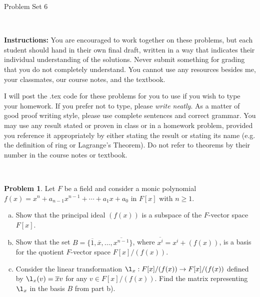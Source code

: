 \documentclass[11pt]{article}
\title{}
\date{\vspace{-0.5in}}
\newcommand{\ov}[1]{\overline{#1}}
\theoremstyle{definition}
\newtheorem{problem}{Problem}
\begin{document}
\thispagestyle{fancy}
\pagestyle{fancy}

\vspace{3em}

\begin{center}
	{\LARGE Problem Set 6}
\end{center}

\

\noindent
{\bf Instructions:}
You are encouraged to work together on these problems, but each student should hand in their own final draft, written in a way that indicates their individual understanding of the solutions. Never submit something for grading that you do not completely understand. You cannot use any resources besides me, your classmates, our course notes, and the textbook.


I will post the .tex code for these problems for you to use if you wish to type your homework. If you prefer not to type, please  {\em write neatly}. As a matter of good proof writing style, please use complete sentences and correct grammar. You may use any result  stated or proven in class or in a homework problem, provided you reference it appropriately by either stating the result or stating its name (e.g. the definition of ring or Lagrange's Theorem). Do not refer to theorems by their number in the course notes or textbook.


\





\begin{problem}
Let $F$ be a field and consider a monic polynomial $f(x)=x^n+a_{n-1}x^{n-1}+\cdots+a_1x+a_0$ in $F[x]$ with $n \geqslant 1$.
\begin{enumerate}[a)]
\item Show that the principal ideal $(f(x))$ is a subspace of the $F$-vector space $F[x]$.
\item Show that  the set $B=\{\ov{1},\ov{x},\ldots,\ov{x^{n-1}}\}$, where $\ov{x^i}=x^i+(f(x))$, is a basis for the quotient $F$-vector space $F[x]/(f(x))$.
\item Consider the linear transformation $\l_x : F [x]/(f (x)) \to F[x]/(f(x))$ defined by $\l_x(v)=\ov{x}v$ for any $v\in F [x]/(f (x))$. Find the matrix representing $\l_x$ in the basis $B$ from part b).
\end{enumerate}	
\end{problem}

\vfill
\end{document}

